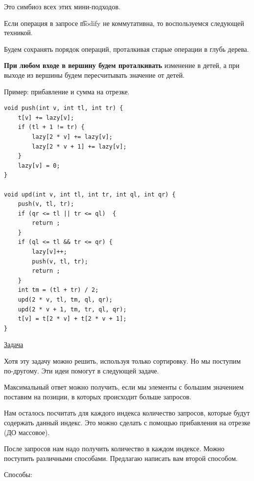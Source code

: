 \pagebreak


Это симбиоз всех этих мини-подходов.

Если операция в запросе \t{modify} не коммутативна, то воспользуемся следующей техникой.

Будем сохранять порядок операций, проталкивая старые операции в глубь дерева.

{\bf При любом входе в вершину будем проталкивать} изменение в детей, а при выходе из вершины будем пересчитывать значение от детей.

Пример: прибавление и сумма на отрезке.


\up \up
\begin{verbatim}
void push(int v, int tl, int tr) {
    t[v] += lazy[v];
    if (tl + 1 != tr) {
        lazy[2 * v] += lazy[v];
        lazy[2 * v + 1] += lazy[v];
    }
    lazy[v] = 0;
}

void upd(int v, int tl, int tr, int ql, int qr) {
    push(v, tl, tr);
    if (qr <= tl || tr <= ql)  {
        return ;
    }
    if (ql <= tl && tr <= qr) {
        lazy[v]++;
        push(v, tl, tr);
        return ;
    }
    int tm = (tl + tr) / 2;
    upd(2 * v, tl, tm, ql, qr);
    upd(2 * v + 1, tm, tr, ql, qr);
    t[v] = t[2 * v] + t[2 * v + 1];
}
\end{verbatim}

\pagebreak


\href{https://codeforces.com/contest/276/problem/C}{Задача}
\href{https://codeforces.com/contest/276/submission/106207096}{}

Хотя эту задачу можно решить, используя только сортировку. Но мы поступим по-другому. Эти идеи помогут в следующей задаче.

Максимальный ответ можно получить, если мы элементы с большим значением поставим на позиции, в которых происходит больше запросов.

Нам осталось посчитать для каждого индекса количество запросов, которые будут содержать данный индекс. Это можно сделать с помощью прибавления на отрезке (ДО массовое).

После запросов нам надо получить количество в каждом индексе. Можно поступить различными способами. Предлагаю написать вам второй способом.
\down

Способы:

